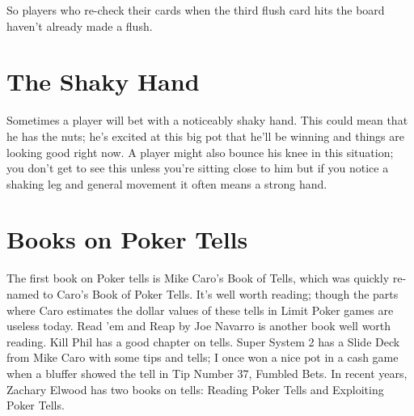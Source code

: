So players who re-check their cards when the third flush card hits the
board haven't already made a flush.

\section{The Shaky Hand}

Sometimes a player will bet with a noticeably shaky hand. This could
mean that he has the nuts; he's excited at this big pot that he'll be
winning and things are looking good right now. A player might also
bounce his knee in this situation; you don't get to see this unless
you're sitting close to him but if you notice a shaking leg and
general movement it often means a strong hand.

\section{Books on Poker Tells}


The first book on Poker tells is Mike Caro's Book of Tells, which was
quickly re-named to Caro's Book of Poker Tells. It's well worth
reading; though the parts where Caro estimates the dollar values of
these tells in Limit Poker games are useless today. Read 'em and Reap
by Joe Navarro is another book well worth reading. Kill Phil has a
good chapter on tells. Super System 2 has a Slide Deck from Mike Caro
with some tips and  tells; I once won a nice pot in a cash game when
a bluffer showed the tell in Tip Number 37, Fumbled Bets.
In recent years, Zachary Elwood has two books on tells: Reading Poker
Tells and Exploiting Poker Tells.
